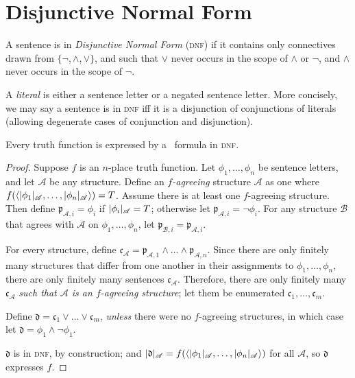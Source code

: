 

\section{Disjunctive Normal Form}


\begin{definition} A sentence is in \emph{Disjunctive Normal Form} (\textsc{\lowercase{DNF}}) if it contains only connectives drawn from $\{\neg,\wedge,\vee\}$, and such that $\vee$ never occurs in the scope of $\wedge$ or $\neg$, and $\wedge$ never occurs in the scope of $\neg$. \end{definition}

A \emph{literal} is either a sentence letter or a negated sentence letter. More concisely, we may say a sentence is in \textsc{\lowercase{DNF}} iff it is a disjunction of conjunctions of literals (allowing degenerate cases of conjunction and disjunction).

\begin{theorem}\label{\textsc{\lowercase{dnf}}}
	Every truth function is expressed by a \lone\ formula in \textsc{\lowercase{DNF}}.
\begin{proof}	
Suppose $f$ is an $n$-place truth function. Let $\phi_{1},\ldots,\phi_{n}$ be  sentence letters, and let $\mathscr{A}$ be any structure.  Define an \emph{$f$-agreeing} structure $\mathscr{A}$ as one where $f(\langle|\phi_{1}|_{\mathscr{A}},\ldots,|\phi_{n}|_{\mathscr{A}}\rangle) = T$. Assume there is at least one $f$-agreeing structure. Then define $\mathfrak{p}_{\mathscr{A},i} = \phi_{i}$ if $|\phi_{i}|_{\mathscr{A}}=T$; otherwise let $\mathfrak{p}_{\mathscr{A},i} = \neg \phi_{i}$. 
For any structure $\mathscr{B}$ that agrees with $\mathscr{A}$ on $\phi_{1},\ldots,\phi_{n}$, let $\mathfrak{p}_{\mathscr{B},i}=\mathfrak{p}_{\mathscr{A},i}$.

For every structure, define $\mathfrak{c}_{\mathscr{A}} = \mathfrak{p}_{\mathscr{A},1}\wedge\ldots\wedge \mathfrak{p}_{\mathscr{A},n}$.  Since there are only finitely many structures that differ from one another in their assignments to $\phi_{1},\ldots,\phi_{n}$, there are only finitely many sentences $\mathfrak{c}_{\mathscr{A}}$.  Therefore, there are only finitely many $\mathfrak{c}_{\mathscr{A}}$ \emph{such that $\mathscr{A}$ is an $f$-agreeing structure}; let them be enumerated $\mathfrak{c}_{1},\ldots,\mathfrak{c}_{m}.$

 Define $\mathfrak{d} = \mathfrak{c}_{1} \vee \ldots \vee \mathfrak{c}_{m}$,  \emph{unless} there were no $f$-agreeing structures, in which case let $\mathfrak{d} = \phi_{1} \wedge \neg \phi_{1}$.



$\mathfrak{d}$ is in \textsc{\lowercase{DNF}}, by construction; and $|\mathfrak{d}|_{\mathscr{A}} = f(\langle|\phi_{1}|_{\mathscr{A}},\ldots,|\phi_{n}|_{\mathscr{A}}\rangle)$ for all $\mathscr{A}$, so $\mathfrak{d}$ expresses $f$. \end{proof}\end{theorem}

